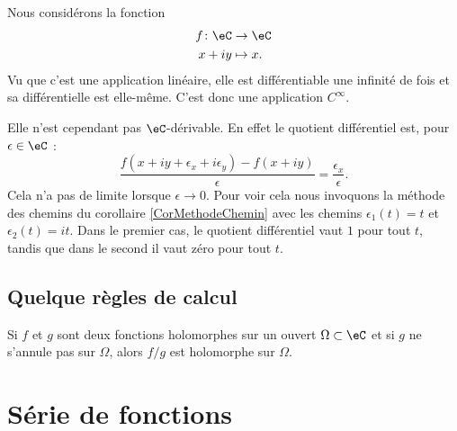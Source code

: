 \begin{example}
    Nous considérons la fonction
    \begin{equation}
        \begin{aligned}
            f\colon \eC&\to \eC \\
            x+iy&\mapsto x. 
        \end{aligned}
    \end{equation}
    Vu que c'est une application linéaire, elle est différentiable une infinité de fois et sa différentielle est elle-même. C'est donc une application \( C^{\infty}\).

    Elle n'est cependant pas \( \eC\)-dérivable. En effet le quotient différentiel est, pour \( \epsilon\in \eC\) :
    \begin{equation}
        \frac{ f(x+iy+\epsilon_x+i\epsilon_y)-f(x+iy) }{ \epsilon }=\frac{ \epsilon_x }{ \epsilon }.
    \end{equation}
    Cela n'a pas de limite lorsque \( \epsilon\to 0\). Pour voir cela nous invoquons la méthode des chemins du corollaire \ref{CorMethodeChemin} avec les chemins \( \epsilon_1(t)=t\) et \( \epsilon_2(t)=it\). Dans le premier cas, le quotient différentiel vaut \( 1\) pour tout \( t\), tandis que dans le second il vaut zéro pour tout \( t\).
\end{example}

\subsection{Quelque règles de calcul}

\begin{lemma}       \label{LEMooVDXOooUyFHXZ}
    Si \( f\) et \( g\) sont deux fonctions holomorphes sur un ouvert \( \Omega\subset \eC\) et si \( g\) ne s'annule pas sur \( \Omega\), alors \( f/g\) est holomorphe sur \( \Omega\).
\end{lemma}

\section{Série de fonctions}

